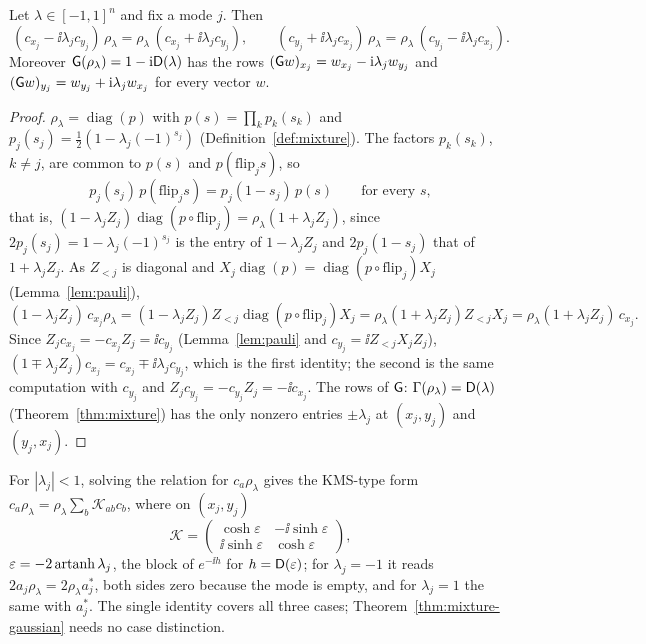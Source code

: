 \begin{lemma}\label{lem:mode}
Let $\lambda\in[-1,1]^n$ and fix a mode $j$. Then
\[
 (c_{x_j}-\ii\lambda_jc_{y_j})\,\rho_\lambda=\rho_\lambda\,(c_{x_j}+\ii\lambda_jc_{y_j}),\qquad
 (c_{y_j}+\ii\lambda_jc_{x_j})\,\rho_\lambda=\rho_\lambda\,(c_{y_j}-\ii\lambda_jc_{x_j}).
\]
Moreover $\mathsf G(\rho_\lambda)=1-\mathrm i\mathsf D(\lambda)$ has the rows
$(\mathsf G w)_{x_j}=w_{x_j}-\mathrm i\lambda_jw_{y_j}$ and $(\mathsf G w)_{y_j}=w_{y_j}+\mathrm i\lambda_jw_{x_j}$ for every
vector $w$.
\end{lemma}
\begin{proof}
$\rho_\lambda=\operatorname{diag}(p)$ with $p(s)=\prod_kp_k(s_k)$ and
$p_j(s_j)=\tfrac12(1-\lambda_j(-1)^{s_j})$ (Definition~\ref{def:mixture}). The factors
$p_k(s_k)$, $k\neq j$, are common to $p(s)$ and $p(\mathrm{flip}_js)$, so
\begin{equation}\label{eq:weight-flip}
 p_j(s_j)\,p(\mathrm{flip}_js)=p_j(1-s_j)\,p(s)\qquad\text{for every }s,
\end{equation}
that is, $(1-\lambda_jZ_j)\operatorname{diag}(p\circ\mathrm{flip}_j)=\rho_\lambda(1+\lambda_jZ_j)$,
since $2p_j(s_j)=1-\lambda_j(-1)^{s_j}$ is the entry of $1-\lambda_jZ_j$ and $2p_j(1-s_j)$ that of
$1+\lambda_jZ_j$. As $Z_{<j}$ is diagonal and $X_j\operatorname{diag}(p)=\operatorname{diag}(p\circ\mathrm{flip}_j)X_j$
(Lemma~\ref{lem:pauli}),
\[
 (1-\lambda_jZ_j)\,c_{x_j}\rho_\lambda=(1-\lambda_jZ_j)Z_{<j}\operatorname{diag}(p\circ\mathrm{flip}_j)X_j
 =\rho_\lambda(1+\lambda_jZ_j)Z_{<j}X_j=\rho_\lambda(1+\lambda_jZ_j)\,c_{x_j}.
\]
Since $Z_jc_{x_j}=-c_{x_j}Z_j=\ii c_{y_j}$ (Lemma~\ref{lem:pauli} and $c_{y_j}=\ii Z_{<j}X_jZ_j$),
$(1\mp\lambda_jZ_j)c_{x_j}=c_{x_j}\mp\ii\lambda_jc_{y_j}$, which is the first identity; the
second is the same computation with $c_{y_j}$ and $Z_jc_{y_j}=-c_{y_j}Z_j=-\ii c_{x_j}$. The
rows of $\mathsf G$: $\Gamma(\rho_\lambda)=\mathsf D(\lambda)$ (Theorem~\ref{thm:mixture}) has the only
nonzero entries $\pm\lambda_j$ at $(x_j,y_j)$ and $(y_j,x_j)$.
\end{proof}
\begin{remark}\label{rem:kms-row}
For $|\lambda_j|<1$, solving the relation for $c_a\rho_\lambda$ gives the KMS-type form
$c_a\rho_\lambda=\rho_\lambda\sum_b\mathcal K_{ab}c_b$, where on $(x_j,y_j)$
\[
 \mathcal K=\begin{pmatrix}\cosh\varepsilon&-\ii\sinh\varepsilon\\ \ii\sinh\varepsilon&\cosh\varepsilon\end{pmatrix},
\] $\varepsilon=-2\operatorname{artanh}\lambda_j$, the block of $e^{-\ii h}$ for $h=\mathsf D(\varepsilon)$;
for $\lambda_j=-1$ it reads $2a_j\rho_\lambda=2\rho_\lambda a_j^*$, both sides zero because the
mode is empty, and for $\lambda_j=1$ the same with $a_j^*$. The single identity covers all
three cases; Theorem~\ref{thm:mixture-gaussian} needs no case distinction.
\end{remark}

